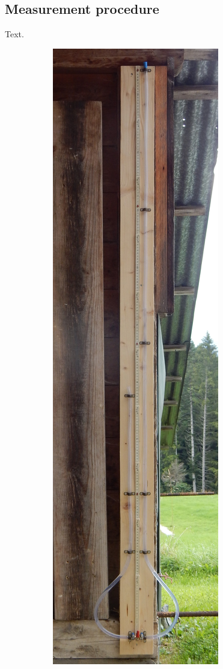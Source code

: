 \documentclass[a4paper,11pt, twocolumn]{article}
\begin{document}
\subsection{Measurement procedure}
Text.

\begin{figure}[h]
	\centering
	\begin{subfigure}{0.22\textwidth}
		\centering
		\includegraphics[width=\textwidth]{figures/picture_initial_cropped.jpg}

\end{subfigure}
\end{figure}
\end{document}
